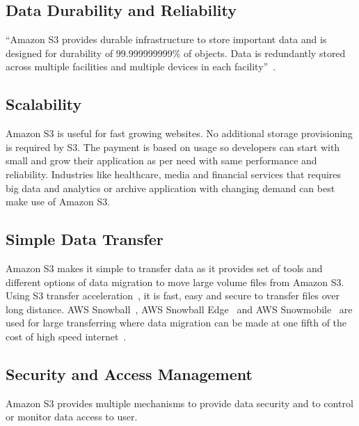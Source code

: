 \subsection{Data Durability and Reliability} 

``Amazon S3 provides durable infrastructure to store important data and is
designed for durability of 99.999999999\% of objects. Data is redundantly
stored across multiple facilities and multiple devices in each
facility''~\cite{hid-sp18-420-amazon-S3}.

\subsection{Scalability}

Amazon S3 is useful for fast growing websites. No additional storage
provisioning is required by S3. The payment is based on usage so developers can
start with small and grow their application as per need with same performance
and reliability. Industries like healthcare, media and financial services that
requires big data and analytics or archive application with changing demand can
best make use of Amazon S3.

\subsection{Simple Data Transfer} 

Amazon S3 makes it simple to transfer data as it provides set of tools and
different options of data migration to move large volume files from Amazon S3.
Using S3 transfer acceleration~\cite{hid-sp18-420-amazon-S3-dataTransfer-FAQ},
it is fast, easy and secure to transfer files over long distance. AWS
Snowball~\cite{hid-sp18-420-amazon-snowball}, AWS Snowball
Edge~\cite{hid-sp18-420-amazon-snowball-edge} and AWS
Snowmobile~\cite{hid-sp18-420-amazon-snowmobile} are used for large transferring
where data migration can be made at one fifth of the cost of high speed
internet~\cite{hid-sp18-420-amazon-S3-cloud-migration}.

\subsection{Security and Access Management} 

Amazon S3 provides multiple mechanisms to provide data security and to control
or monitor data access to user.


